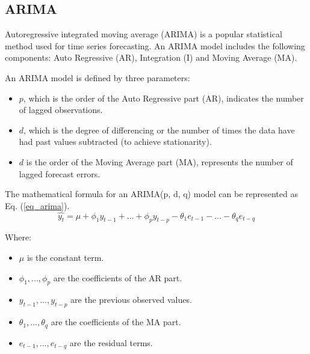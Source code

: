 \documentclass[conference]{IEEEtran}
\begin{document}
\subsection{ARIMA}
Autoregressive integrated moving average (ARIMA) is a popular statistical method used for time series forecasting. An ARIMA model includes the following components: Auto Regressive (AR), Integration (I) and Moving Average (MA).\par
An ARIMA model is defined by three parameters:\par
\begin{itemize}
    \item \(p\), which is the order of the Auto Regressive part (AR), indicates the number of lagged observations.
    \item \(d\), which is the degree of differencing or the number of times the data have had past values subtracted (to achieve stationarity).
    \item \(d\) is the order of the Moving Average part (MA), represents the number of lagged forecast errors.
\end{itemize}\par
The mathematical formula for an ARIMA(p, d, q) model can be represented as Eq. (\ref{eq_arima}).
\begin{equation}\label{eq_arima}
    \hat{y_t} = \mu + \phi_1y_{t-1} + ... + \phi_py_{t-p} - \theta_1e_{t-1} - ... - \theta_qe_{t-q}
\end{equation}\par
Where:
\begin{itemize}
    \item \(\mu\) is the constant term.
    \item \(\phi_1, ..., \phi_p\) are the coefficients of the AR part.
    \item \(y_{t-1}, ..., y_{t-p}\) are the previous observed values.
    \item \(\theta_1, ..., \theta_q\) are the coefficients of the MA part.
    \item \(e_{t-1}, ..., e_{t-q}\) are the residual terms.
\end{itemize}
\end{document}
